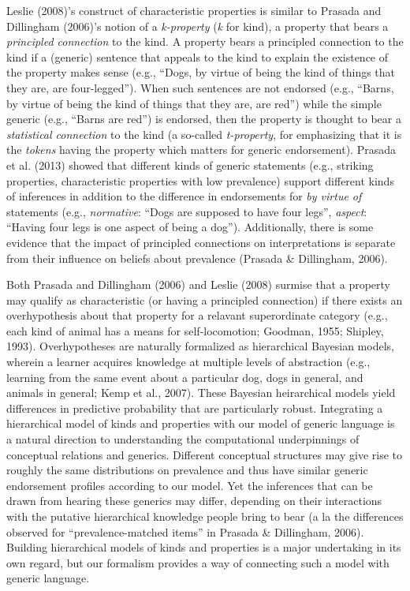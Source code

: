 \documentclass[english,,man,floatsintext]{apa6}
\theoremstyle{definition}
\theoremstyle{definition}
\theoremstyle{definition}
\theoremstyle{remark}
\begin{document}
Leslie (2008)'s construct of characteristic properties is similar to
Prasada and Dillingham (2006)'s notion of a \emph{k-property} (\emph{k}
for kind), a property that bears a \emph{principled connection} to the
kind. A property bears a principled connection to the kind if a
(generic) sentence that appeals to the kind to explain the existence of
the property makes sense (e.g., \enquote{Dogs, by virtue of being the
kind of things that they are, are four-legged}). When such sentences are
not endorsed (e.g., \enquote{Barns, by virtue of being the kind of
things that they are, are red}) while the simple generic (e.g.,
\enquote{Barns are red}) is endorsed, then the property is thought to
bear a \emph{statistical connection} to the kind (a so-called
\emph{t-property}, for emphasizing that it is the \emph{tokens} having
the property which matters for generic endorsement). Prasada et al.
(2013) showed that different kinds of generic statements (e.g., striking
properties, characteristic properties with low prevalence) support
different kinds of inferences in addition to the difference in
endorsements for \emph{by virtue of} statements (e.g., \emph{normative}:
\enquote{Dogs are supposed to have four legs}, \emph{aspect}:
\enquote{Having four legs is one aspect of being a dog}). Additionally,
there is some evidence that the impact of principled connections on
interpretations is separate from their influence on beliefs about
prevalence (Prasada \& Dillingham, 2006).

Both Prasada and Dillingham (2006) and Leslie (2008) surmise that a
property may qualify as characteristic (or having a principled
connection) if there exists an overhypothesis about that property for a
relavant superordinate category (e.g., each kind of animal has a means
for self-locomotion; Goodman, 1955; Shipley, 1993). Overhypotheses are
naturally formalized as hierarchical Bayesian models, wherein a learner
acquires knowledge at multiple levels of abstraction (e.g., learning
from the same event about a particular dog, dogs in general, and animals
in general; Kemp et al., 2007). These Bayesian heirarchical models yield
differences in predictive probability that are particularly robust.
Integrating a hierarchical model of kinds and properties with our model
of generic language is a natural direction to understanding the
computational underpinnings of conceptual relations and generics.
Different conceptual structures may give rise to roughly the same
distributions on prevalence and thus have similar generic endorsement
profiles according to our model. Yet the inferences that can be drawn
from hearing these generics may differ, depending on their interactions
with the putative hierarchical knowledge people bring to bear (a la the
differences observed for ``prevalence-matched items'' in Prasada \&
Dillingham, 2006). Building hierarchical models of kinds and properties
is a major undertaking in its own regard, but our formalism provides a
way of connecting such a model with generic language.
\end{document}
